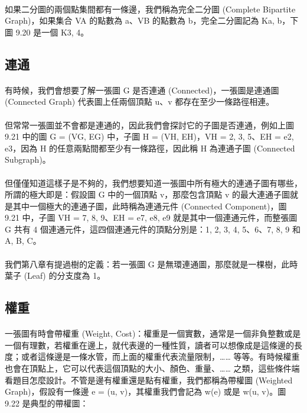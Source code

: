 \documentclass[12pt,a4paper,oneside]{report}
\begin{document}
\begin{CJK}{UTF8}{bkai}
\paragraph{}如果二分圖的兩個點集間都有一條邊，我們稱為完全二分圖 (Complete Bipartite Graph)，如果集合 VA 的點數為 a、VB 的點數為 b，完全二分圖記為 Ka, b，下圖 9.20 是一個 K3, 4。

\subsection{連通}
\paragraph{}有時候，我們會想要了解一張圖 G 是否連通 (Connected)，一張圖是連通圖 (Connected Graph) 代表圖上任兩個頂點 u、v 都存在至少一條路徑相連。
\paragraph{}但常常一張圖並不會都是連通的，因此我們會探討它的子圖是否連通，例如上圖 9.21 中的圖 G = (VG, EG) 中，子圖 H = (VH, EH)，VH = {2, 3, 5}、EH = {e2, e3}，因為 H 的任意兩點間都至少有一條路徑，因此稱 H 為連通子圖 (Connected Subgraph)。
\paragraph{}但僅僅知道這樣子是不夠的，我們想要知道一張圖中所有極大的連通子圖有哪些，所謂的極大即是：假設圖 G 中的一個頂點 v，那麼包含頂點 v 的最大連通子圖就是其中一個極大的連通子圖，此時稱為連通元件 (Connected Component)，圖 9.21 中，子圖 VH = {7, 8, 9}、EH = {e7, e8, e9} 就是其中一個連通元件，而整張圖 G 共有 4 個連通元件，這四個連通元件的頂點分別是：{1, 2, 3, 4, 5}、{6}、{7, 8, 9} 和 {A, B, C}。
\paragraph{}我們第八章有提過樹的定義：若一張圖 G 是無環連通圖，那麼就是一棵樹，此時葉子 (Leaf) 的分支度為 1。

\subsection{權重}
\paragraph{}一張圖有時會帶權重 (Weight, Cost)：權重是一個實數，通常是一個非負整數或是一個有理數，若權重在邊上，就代表邊的一種性質，讀者可以想像成是這條邊的長度；或者這條邊是一條水管，而上面的權重代表流量限制，…… 等等。有時候權重也會在頂點上，它可以代表這個頂點的大小、顏色、重量、…… 之類，這些條件端看題目怎麼設計。不管是邊有權重還是點有權重，我們都稱為帶權圖 (Weighted Graph)，假設有一條邊 e = (u, v)，其權重我們會記為 w(e) 或是 w(u, v)。圖 9.22 是典型的帶權圖：


\end{CJK}
\end{document}
